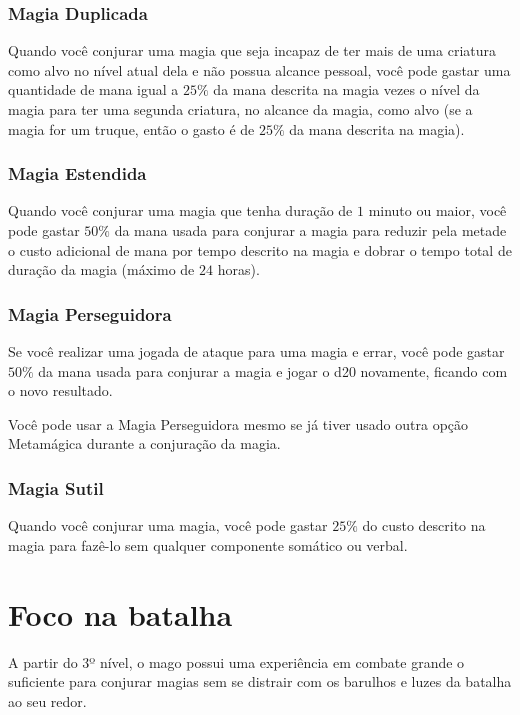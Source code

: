 \documentclass{RPG_Adventure}[2021/10/20]
\begin{document}
\begin{multicols}{2}
\subsubsection*{Magia Duplicada}%

Quando você conjurar uma magia que seja incapaz de ter mais de uma criatura como
alvo no nível atual dela e não possua alcance pessoal, você pode gastar uma
quantidade de mana igual a $25\%$ da mana descrita na magia vezes o nível da
magia para ter uma segunda criatura, no alcance da magia, como alvo (se a magia
for um truque, então o gasto é de $25\%$ da mana descrita na magia).

\subsubsection{Magia Estendida}%

Quando você conjurar uma magia que tenha duração de $1$ minuto ou maior, você
pode gastar $50\%$ da mana usada para conjurar a magia para reduzir pela metade o
custo adicional de mana por tempo descrito na magia e dobrar o tempo total de
duração da magia (máximo de $24$ horas).

\subsubsection*{Magia Perseguidora}%

Se você realizar uma jogada de ataque para uma magia e errar, você pode gastar
$50\%$ da mana usada para conjurar a magia e jogar o d20 novamente, ficando com
o novo resultado.

Você pode usar a Magia Perseguidora mesmo se já tiver usado outra opção
Metamágica durante a conjuração da magia.

\subsubsection*{Magia Sutil}%

Quando você conjurar uma magia, você pode gastar $25\%$ do custo descrito na
magia para fazê-lo sem qualquer componente somático ou verbal.

\section*{Foco na batalha}%

A partir do 3º nível, o mago possui uma experiência em combate grande o
suficiente para conjurar magias sem se distrair com os barulhos e luzes da
batalha ao seu redor.


\end{multicols}
\end{document}
